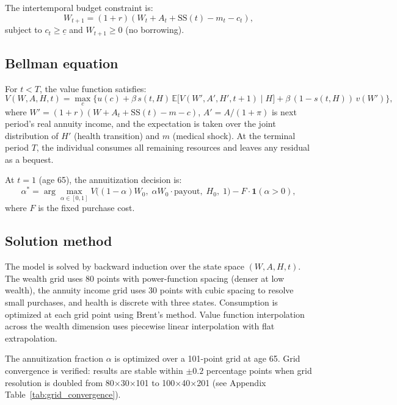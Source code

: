 \documentclass[12pt]{article}
\begin{document}
The intertemporal budget constraint is:
\begin{equation}
\label{eq:budget}
W_{t+1} = (1 + r)(W_t + A_t + \text{SS}(t) - m_t - c_t),
\end{equation}
subject to $c_t \geq \underline{c}$ and $W_{t+1} \geq 0$ (no borrowing).

\subsection{Bellman equation}

For $t < T$, the value function satisfies:
\begin{equation}
\label{eq:bellman}
V(W, A, H, t) = \max_{c} \Big\{ u(c) + \beta \, s(t, H) \, \mathbb{E}\big[V(W', A', H', t+1) \mid H\big] + \beta \, (1 - s(t, H)) \, v(W') \Big\},
\end{equation}
where $W' = (1+r)(W + A_t + \text{SS}(t) - m - c)$, $A' = A/(1+\pi)$ is next period's real annuity income, and the expectation is taken over the joint distribution of $H'$ (health transition) and $m$ (medical shock). At the terminal period $T$, the individual consumes all remaining resources and leaves any residual as a bequest.

At $t = 1$ (age 65), the annuitization decision is:
\begin{equation}
\label{eq:annuitize}
\alpha^* = \arg\max_{\alpha \in [0,1]} V\big((1-\alpha) W_0, \; \alpha W_0 \cdot \text{payout}, \; H_0, \; 1\big) - F \cdot \mathbf{1}(\alpha > 0),
\end{equation}
where $F$ is the fixed purchase cost.

\subsection{Solution method}

The model is solved by backward induction over the state space $(W, A, H, t)$. The wealth grid uses 80 points with power-function spacing (denser at low wealth), the annuity income grid uses 30 points with cubic spacing to resolve small purchases, and health is discrete with three states. Consumption is optimized at each grid point using Brent's method. Value function interpolation across the wealth dimension uses piecewise linear interpolation with flat extrapolation.

The annuitization fraction $\alpha$ is optimized over a 101-point grid at age 65. Grid convergence is verified: results are stable within $\pm 0.2$ percentage points when grid resolution is doubled from 80$\times$30$\times$101 to 100$\times$40$\times$201 (see Appendix Table~\ref{tab:grid_convergence}).
\end{document}
